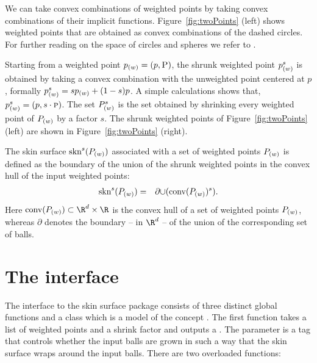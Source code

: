 We can take convex combinations of weighted points by taking convex
combinations of their implicit functions. Figure~\ref{fig:twoPoints}
(left) shows weighted points that are obtained as convex combinations
of the dashed circles. For further reading on the space of circles and
spheres we refer to \cite{p-gcc-70}.

Starting from a weighted point ${p}_{(w)}=({p},\textsc{P})$, the
shrunk weighted point ${p}_{(w)}^s$ is obtained by taking a convex
combination with the unweighted point centered at $p$, formally
${p}_{(w)}^s = s {p}_{(w)} + (1-s) p$. A simple calculations
shows that, ${p}_{(w)}^s = ({p},s\cdot \textsc{p})$.  The set
${P}_{(w)}^s$ is the set obtained by shrinking every weighted point
of ${P}_{(w)}$ by a factor $s$. The shrunk weighted points of
Figure~\ref{fig:twoPoints} (left) are shown in
Figure~\ref{fig:twoPoints} (right).

The skin surface $\mbox{skn}^{s}({P}_{(w)})$ associated with a set
of weighted points ${P}_{(w)}$ is defined as the boundary of the
union of the shrunk weighted points in the convex hull of the input
weighted points:
\begin{eqnarray}
  \label{eq:defskin}
  \mbox{skn}^{s}({P}_{(w)}) &=& \partial{\cup(\mbox{conv} ({P}_{(w)})^s)}.
\end{eqnarray}
%
Here $\mbox{conv}(\ssWpoint{P}) \subset \R^d\times\R$ is the convex
hull of a set of weighted points ${P}_{(w)}$, whereas $\partial$
denotes the boundary -- in $\R^d$ -- of the union of the corresponding
set of balls. 


\section{The interface}
The interface to the skin surface package consists of three distinct
global functions and a class  which is a model of
the concept .  The first function takes a list of
weighted points and a shrink factor and outputs a
. The parameter  is a tag that controls
whether the input balls are grown in such a way that the skin surface
wraps around the input balls. There are two overloaded functions:


